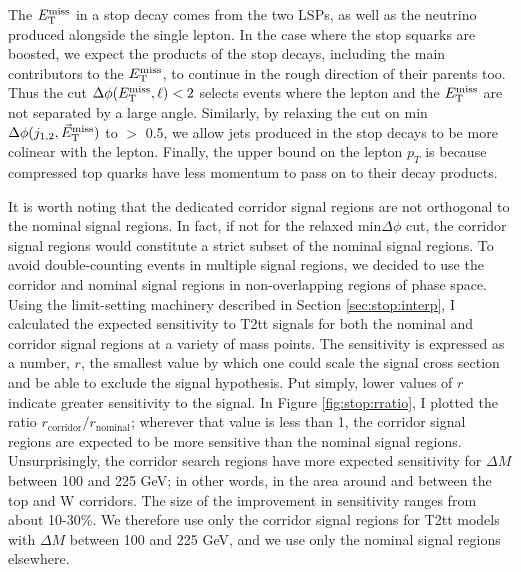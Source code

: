 The $E_\text{T}^\text{miss}$ in a stop decay comes from the two LSPs, as well as the
neutrino produced alongside the single lepton. In the case where the
stop squarks are boosted, we expect the products of the stop decays,
including the main contributors to the
$E_\text{T}^\text{miss}$, to continue in the rough direction of their parents too. Thus the cut
$\Delta\phi (E_\text{T}^\text{miss}, \ell) < 2$ selects events where the lepton and the
$E_\text{T}^\text{miss}$ are not separated by a large angle. Similarly, by relaxing
the cut on min$\Delta \phi(j_{1,2},\vec{E}_\text{T}^\text{miss})$ to $>$ 0.5, we allow jets
produced in the stop decays to be more colinear with the lepton.
Finally, the upper bound on the lepton $p_T$ is because compressed top
quarks have less momentum to pass on to their decay products.


It is worth noting that the dedicated corridor signal regions are not
orthogonal to the nominal signal regions. In fact, if not for the
relaxed min$\Delta\phi$ cut, the corridor signal regions would
constitute a strict subset of the nominal signal regions. To avoid
double-counting events in multiple signal regions, we decided to use
the corridor and nominal signal regions in non-overlapping regions of
phase space. Using the limit-setting machinery described in Section
\ref{sec:stop:interp}, I calculated the expected sensitivity to T2tt
signals for both the nominal and corridor signal regions at a variety
of mass points. The sensitivity is expressed as a number, $r$, the
smallest value by which one could scale the signal cross section and
be able to exclude the signal hypothesis. Put simply, lower values
of $r$ indicate greater sensitivity to the signal. In Figure
\ref{fig:stop:rratio}, I plotted the ratio
$r_\text{corridor} / r_\text{nominal}$; wherever that value is less
than 1, the corridor signal regions are expected to be more sensitive
than the nominal signal regions. Unsurprisingly, the corridor search
regions have more expected sensitivity for $\Delta M$ between 100 and
225 GeV; in other words, in the area around and between the top and W
corridors. The size of the improvement in sensitivity ranges from
about 10-30\%. We therefore use only the corridor signal regions for
T2tt models with $\Delta M$ between 100 and 225 GeV, and we use only
the nominal signal regions elsewhere.

